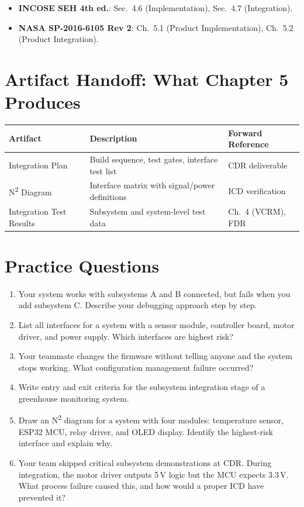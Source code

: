 \documentclass[11pt,letterpaper,twoside,openany]{book}
\begin{document}
\begin{keyconceptbox}
\begin{itemize}[nosep,leftmargin=1.5em]
\item \textbf{INCOSE SEH 4th ed.}: Sec.\ 4.6 (Implementation), Sec.\ 4.7 (Integration).
\item \textbf{NASA SP-2016-6105 Rev 2}: Ch.\ 5.1 (Product Implementation), Ch.\ 5.2 (Product Integration).
\end{itemize}
\end{keyconceptbox}

\section{Artifact Handoff: What Chapter 5 Produces}
\begin{table}[htbp]\centering\small
\begin{tabularx}{\textwidth}{l X l}
\toprule
\textbf{Artifact} & \textbf{Description} & \textbf{Forward Reference} \\
\midrule
Integration Plan & Build sequence, test gates, interface test list & CDR deliverable \\
N\textsuperscript{2} Diagram & Interface matrix with signal/power definitions & ICD verification \\
Integration Test Results & Subsystem and system-level test data & Ch.~4 (VCRM), FDR \\
\bottomrule
\end{tabularx}
\end{table}

\section{Practice Questions}
\begin{enumerate}[leftmargin=1.5em]
\item Your system works with subsystems A and B connected, but fails when you add subsystem C. Describe your debugging approach step by step.
\item List all interfaces for a system with a sensor module, controller board, motor driver, and power supply. Which interfaces are highest risk?
\item Your teammate changes the firmware without telling anyone and the system stops working. What configuration management failure occurred?
\item Write entry and exit criteria for the subsystem integration stage of a greenhouse monitoring system.
\item Draw an N\textsuperscript{2} diagram for a system with four modules: temperature sensor, ESP32 MCU, relay driver, and OLED display. Identify the highest-risk interface and explain why.
\item Your team skipped critical subsystem demonstrations at CDR. During integration, the motor driver outputs 5\,V logic but the MCU expects 3.3\,V. What process failure caused this, and how would a proper ICD have prevented it?
\end{enumerate}
\end{document}
